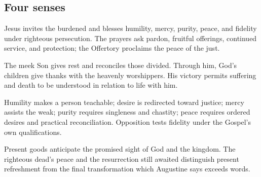 \subsection{Four senses}
\begin{fourSenses}
\item[Literal.] Jesus invites the burdened and blesses humility,
mercy, purity, peace, and fidelity under righteous persecution.
The prayers ask pardon, fruitful offerings, continued service,
and protection; the Offertory proclaims the peace of the just.
\item[Allegorical.] The meek Son gives rest and reconciles those
divided. Through him, God's children give thanks with the
heavenly worshippers. His victory permits suffering and death
to be understood in relation to life with him.
\item[Moral.] Humility makes a person teachable; desire is
redirected toward justice; mercy assists the weak; purity
requires singleness and chastity; peace requires ordered
desires and practical reconciliation. Opposition tests
fidelity under the Gospel's own qualifications.
\item[Anagogical.] Present goods anticipate the promised sight
of God and the kingdom. The righteous dead's peace and the
resurrection still awaited distinguish present refreshment
from the final transformation which Augustine says exceeds
words.
\end{fourSenses}
